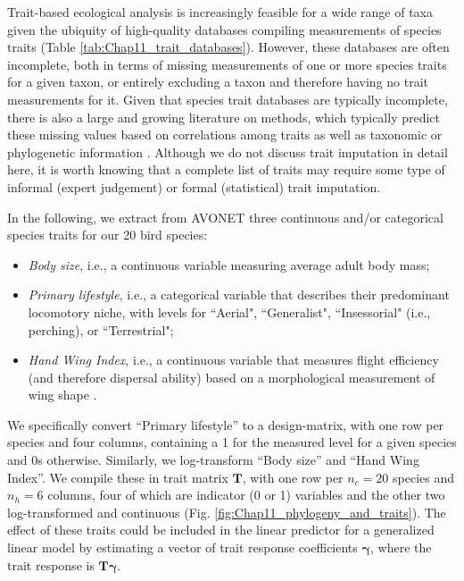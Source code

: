 Trait-based ecological analysis is increasingly feasible for a wide range of taxa given the ubiquity of high-quality databases compiling measurements of species traits (Table \ref{tab:Chap11_trait_databases}).  However, these databases are often incomplete, both in terms of missing measurements of one or more species traits for a given taxon, or entirely excluding a taxon and therefore having no trait measurements for it.  Given that species trait databases are typically incomplete, there is also a large and growing literature on  methods, which typically predict these missing values based on correlations among traits as well as taxonomic or phylogenetic information \cite{penone_imputation_2014}. Although we do not discuss trait imputation in detail here, it is worth knowing that a complete list of traits may require some type of informal (expert judgement) or formal (statistical) trait imputation. 

In the following, we extract from AVONET three continuous and/or categorical species traits for our 20 bird species:
\begin{itemize}
    \item \textit{Body size}, i.e., a continuous variable measuring average adult body mass;

    \item \textit{Primary lifestyle}, i.e., a categorical variable that describes their predominant locomotory niche, with levels for ``Aerial", ``Generalist", ``Insessorial" (i.e., perching), or ``Terrestrial";

    \item \textit{Hand Wing Index}, i.e., a continuous variable that measures flight efficiency (and therefore dispersal ability) based on a morphological measurement of wing shape \cite{sheard_ecological_2020}.
\end{itemize}
We specifically convert ``Primary lifestyle'' to a design-matrix, with one row per species and four columns, containing a 1 for the measured level for a given species and 0s otherwise.  Similarly, we log-transform ``Body size'' and ``Hand Wing Index''.  We compile these in trait matrix \(\mathbf{T}\), with one row per \(n_c=20\) species and \(n_h=6\) columns, four of which are indicator (0 or 1) variables and the other two log-transformed and continuous (Fig. \ref{fig:Chap11_phylogeny_and_traits}). The effect of these traits could be included in the linear predictor for a generalized linear model by estimating a vector of trait response coefficients \(\mathbf{\gamma}\), where the trait response is \( \mathbf{T\gamma}\).  

